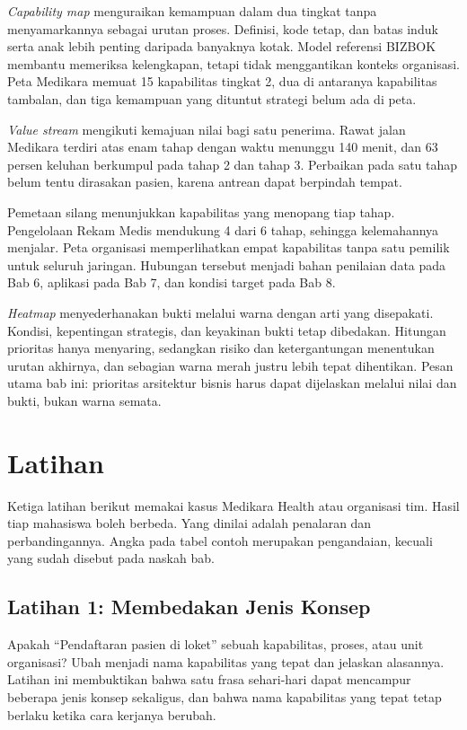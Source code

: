 \textit{Capability map} menguraikan kemampuan dalam dua tingkat tanpa menyamarkannya sebagai urutan proses. Definisi, kode tetap,
dan batas induk serta anak lebih penting daripada banyaknya kotak. Model referensi BIZBOK membantu memeriksa kelengkapan, tetapi
tidak menggantikan konteks organisasi. Peta Medikara memuat 15 kapabilitas tingkat 2, dua di antaranya kapabilitas tambalan, dan
tiga kemampuan yang dituntut strategi belum ada di peta.

\textit{Value stream} mengikuti kemajuan nilai bagi satu penerima. Rawat jalan Medikara terdiri atas enam tahap dengan waktu menunggu
140 menit, dan 63 persen keluhan berkumpul pada tahap 2 dan tahap 3. Perbaikan pada satu tahap belum tentu dirasakan pasien, karena
antrean dapat berpindah tempat.

Pemetaan silang menunjukkan kapabilitas yang menopang tiap tahap. Pengelolaan Rekam Medis mendukung 4 dari 6 tahap, sehingga kelemahannya
menjalar. Peta organisasi memperlihatkan empat kapabilitas tanpa satu pemilik untuk seluruh jaringan. Hubungan tersebut menjadi bahan
penilaian data pada Bab 6, aplikasi pada Bab 7, dan kondisi target pada Bab 8.

\textit{Heatmap} menyederhanakan bukti melalui warna dengan arti yang disepakati. Kondisi, kepentingan strategis, dan keyakinan bukti
tetap dibedakan. Hitungan prioritas hanya menyaring, sedangkan risiko dan ketergantungan menentukan urutan akhirnya, dan sebagian warna
merah justru lebih tepat dihentikan. Pesan utama bab ini: prioritas arsitektur bisnis harus dapat dijelaskan melalui nilai dan bukti,
bukan warna semata.

\section{Latihan}

Ketiga latihan berikut memakai kasus Medikara Health atau organisasi tim. Hasil tiap mahasiswa boleh berbeda. Yang dinilai adalah penalaran
dan perbandingannya. Angka pada tabel contoh merupakan pengandaian, kecuali yang sudah disebut pada naskah bab.

\subsection*{Latihan 1: Membedakan Jenis Konsep}

Apakah ``Pendaftaran pasien di loket'' sebuah kapabilitas, proses, atau unit organisasi? Ubah menjadi nama kapabilitas yang tepat dan jelaskan
alasannya. Latihan ini membuktikan bahwa satu frasa sehari-hari
dapat mencampur beberapa jenis konsep sekaligus, dan bahwa nama kapabilitas yang tepat tetap berlaku ketika cara kerjanya berubah.

